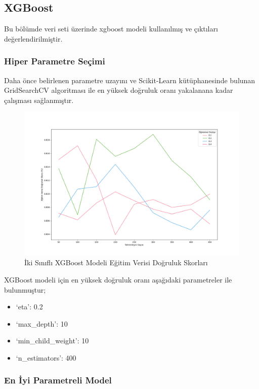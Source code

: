 \documentclass[12pt,twoside]{deuthesis}
\providecommand{\tightlist}{%
  \setlength{\itemsep}{0pt}\setlength{\parskip}{0pt}}
\begin{document}
\hypertarget{bin_xgb}{%
\subsection{XGBoost}\label{bin_xgb}}

Bu bölümde veri seti üzerinde xgboost modeli kullanılmış ve çıktıları değerlendirilmiştir.

\hypertarget{hiper-parametre-seuxe7imi-6}{%
\subsubsection{Hiper Parametre Seçimi}\label{hiper-parametre-seuxe7imi-6}}

Daha önce belirlenen parametre uzayını ve Scikit-Learn kütüphanesinde bulunan GridSearchCV algoritması ile en yüksek doğruluk oranı yakalanana kadar çalışması sağlanmıştır.
\begin{figure}

{\centering \includegraphics[width=1.1\linewidth,height=0.55\textheight]{figure/XGB_bin_Grid_Graph} 

}

\caption{İki Sınıflı XGBoost Modeli Eğitim Verisi Doğruluk Skorları}\label{fig:unnamed-chunk-68}
\end{figure}
XGBoost modeli için en yüksek doğruluk oranı aşağıdaki parametreler ile bulunmuştur;
\begin{itemize}
\tightlist
\item
  `eta': 0.2\\
\item
  `max\_depth': 10\\
\item
  `min\_child\_weight': 10\\
\item
  `n\_estimators': 400\\
  \newpage  
\end{itemize}
\hypertarget{en-iyi-parametreli-model-4}{%
\subsubsection{En İyi Parametreli Model}\label{en-iyi-parametreli-model-4}}
\end{document}

